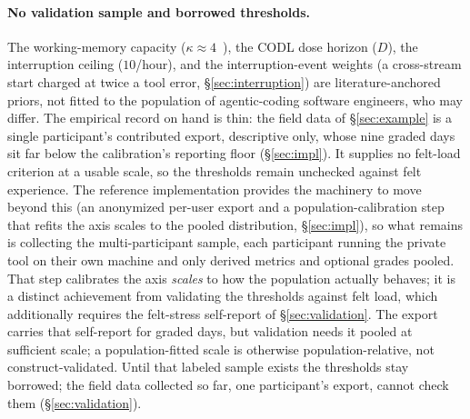 \documentclass[10pt,twocolumn]{article}
\begin{document}
\paragraph{No validation sample and borrowed thresholds.} The working-memory
capacity ($\kappa\approx 4$~\cite{cowan2001}), the CODL dose horizon ($D$),
the interruption ceiling ($10$/hour), and the interruption-event weights (a
cross-stream start charged at twice a tool error, \S\ref{sec:interruption})
are literature-anchored priors, not fitted
to the population of agentic-coding software engineers, who may differ. The
empirical record on hand is thin: the field data of \S\ref{sec:example} is a
single participant's contributed export, descriptive only, whose nine graded
days sit far below the calibration's reporting floor
(\S\ref{sec:impl}). It supplies no felt-load criterion at a usable scale,
so the thresholds remain unchecked against felt experience. The
reference implementation provides the machinery to move beyond this (an anonymized
per-user export and a population-calibration step that refits the axis scales to
the pooled distribution, \S\ref{sec:impl}), so what remains is collecting the
multi-participant sample, each participant running the private tool on their
own machine and only derived metrics and optional grades pooled. That step
calibrates the axis \emph{scales} to how the population actually behaves; it is
a distinct achievement from validating the thresholds against felt load, which
additionally requires the felt-stress self-report of \S\ref{sec:validation}.
The export carries that self-report for graded days, but validation needs it
pooled at sufficient scale; a population-fitted scale is otherwise
population-relative, not construct-validated. Until that labeled sample exists
the thresholds stay borrowed; the field data collected so far, one
participant's export, cannot check them (\S\ref{sec:validation}).
\end{document}
